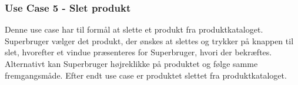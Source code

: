 \subsubsection{Use Case 5 - Slet produkt}
Denne use case har til formål at slette et produkt fra produktkataloget. Superbruger vælger det produkt, der ønskes at slettes og trykker på knappen til slet, hvorefter et vindue præsenteres for Superbruger, hvori der bekræftes. Alternativt kan Superbruger højreklikke på produktet og følge samme fremgangsmåde. Efter endt use case er produktet slettet fra produktkataloget.